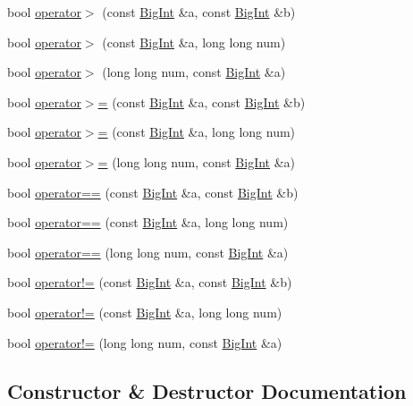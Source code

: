 \begin{DoxyCompactItemize}
\item 
bool \hyperlink{class_big_int_a983eaea8ba326a099f99bce4c549e88b}{operator$>$} (const \hyperlink{class_big_int}{Big\+Int} \&a, const \hyperlink{class_big_int}{Big\+Int} \&b)
\item 
bool \hyperlink{class_big_int_a7cfb997360d9048effea030a384d1a36}{operator$>$} (const \hyperlink{class_big_int}{Big\+Int} \&a, long long num)
\item 
bool \hyperlink{class_big_int_add42067da9b90d99aa447ba53f692a89}{operator$>$} (long long num, const \hyperlink{class_big_int}{Big\+Int} \&a)
\item 
bool \hyperlink{class_big_int_a6253054c5127ed3304f637c952bffacd}{operator$>$=} (const \hyperlink{class_big_int}{Big\+Int} \&a, const \hyperlink{class_big_int}{Big\+Int} \&b)
\item 
bool \hyperlink{class_big_int_ab7841b8b5f6ecedb7ee0dc58a4f97511}{operator$>$=} (const \hyperlink{class_big_int}{Big\+Int} \&a, long long num)
\item 
bool \hyperlink{class_big_int_ac98b40639896d4fde454e5297883f915}{operator$>$=} (long long num, const \hyperlink{class_big_int}{Big\+Int} \&a)
\item 
bool \hyperlink{class_big_int_a9965b82607faf4a2d27e53911f43773f}{operator==} (const \hyperlink{class_big_int}{Big\+Int} \&a, const \hyperlink{class_big_int}{Big\+Int} \&b)
\item 
bool \hyperlink{class_big_int_a5b3f710ea2ac3c06f9f14e2171630afe}{operator==} (const \hyperlink{class_big_int}{Big\+Int} \&a, long long num)
\item 
bool \hyperlink{class_big_int_a1079744c0759d3a798059486640ae0af}{operator==} (long long num, const \hyperlink{class_big_int}{Big\+Int} \&a)
\item 
bool \hyperlink{class_big_int_ad8b84069166f6688a3d8d76d9ec20c6d}{operator!=} (const \hyperlink{class_big_int}{Big\+Int} \&a, const \hyperlink{class_big_int}{Big\+Int} \&b)
\item 
bool \hyperlink{class_big_int_a996220a32a59c19000f3dac78c2edd31}{operator!=} (const \hyperlink{class_big_int}{Big\+Int} \&a, long long num)
\item 
bool \hyperlink{class_big_int_ac1bc6e9585c3d90ac028eb0ed5a8f705}{operator!=} (long long num, const \hyperlink{class_big_int}{Big\+Int} \&a)
\end{DoxyCompactItemize}


\subsection{Constructor \& Destructor Documentation}

